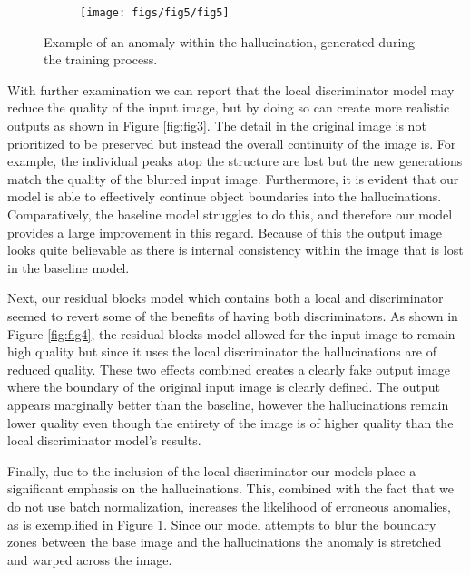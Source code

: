 \documentclass{article}
\begin{document}
\begin{figure}
	\captionsetup[subfigure]{labelformat=empty}
    \centering
    \begin{subfigure}[b]{0.25\textwidth}
        \texttt{[image: figs/fig5/fig5]}
    \end{subfigure}
  	\caption{Example of an anomaly within the hallucination, generated during the training process.}
  	\label{fig:fig5}
\end{figure}

With further examination we can report that the local discriminator model may reduce the quality of the input image, but by doing so can create more realistic outputs as shown in Figure \ref{fig:fig3}. The detail in the original image is not prioritized to be preserved but instead the overall continuity of the image is. For example, the individual peaks atop the structure are lost but the new generations match the quality of the blurred input image. Furthermore, it is evident that our model is able to effectively continue object boundaries into the hallucinations. Comparatively, the baseline model struggles to do this, and therefore our model provides a large improvement in this regard. Because of this the output image looks quite believable as there is internal consistency within the image that is lost in the baseline model.

Next, our residual blocks model which contains both a local and discriminator seemed to revert some of the benefits of having both discriminators. As shown in Figure \ref{fig:fig4}, the residual blocks model allowed for the input image to remain high quality but since it uses the local discriminator the hallucinations are of reduced quality. These two effects combined creates a clearly fake output image where the boundary of the original input image is clearly defined. The output appears marginally better than the baseline, however the hallucinations remain lower quality even though the entirety of the image is of higher quality than the local discriminator model's results.

Finally, due to the inclusion of the local discriminator our models place a significant emphasis on the hallucinations. This, combined with the fact that we do not use batch normalization, increases the likelihood of erroneous anomalies, as is exemplified in Figure \ref{fig:fig5}. Since our model attempts to blur the boundary zones between the base image and the hallucinations the anomaly is stretched and warped across the image.
\end{document}
